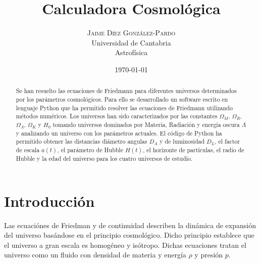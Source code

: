 \documentclass[twoside]{article}
\title{
	\vspace{-15mm}
	\fontsize{28pt}{10pt}
	\selectfont\textbf{Calculadora Cosmológica}%
}
\author{
	\large
	\textsc{Jaime D\'iez Gonz\'alez-Pardo}\\[4mm]
	\fontsize{28pt}{10pt} Universidad de Cantabria \\ %
	\normalsize Astrofísica \\ 
}
\date{ \today }
\begin{document}
	\maketitle %


	\thispagestyle{fancy} %


	\begin{abstract}

		\noindent%

			Se han resuelto las ecuaciones de Friedmann para diferentes universos determinados por los parámetros cosmológicos. Para ello se desarrollado un software escrito en lenguaje Python que ha permitido resolver las ecuaciones de Friedmann utilizando métodos numéricos. Los universos han sido caracterizados por las constantes $\Omega_M$, $\Omega_R$, $\Omega_\Lambda$, $\Omega_K$ y $H_0$ tomando universos dominados por Materia, Radiación y energía oscura $\Lambda$ y analizando un universo con los parámetros actuales. El código de Python ha permitido obtener las distancias diámetro angulas $D_A$ y de luminosidad $D_L$, el factor de escala $a(t)$, el parámetro de Hubble $H(t)$, el horizonte de partículas, el radio de Hubble y la edad del universo para los cuatro universos de estudio.

	\end{abstract}



		\section{Introducción} %
							 
			Las ecuaciónes de Friedman y de continuidad describen la dinámica de expansión del universo basándose en el principio cosmológico. Dicho principio establece que el universo a gran escala es homogéneo y isótropo. Dichas ecuaciones tratan el universo como un fluido con densidad de materia y energía $\rho$ y presión $p$.
\end{document}
